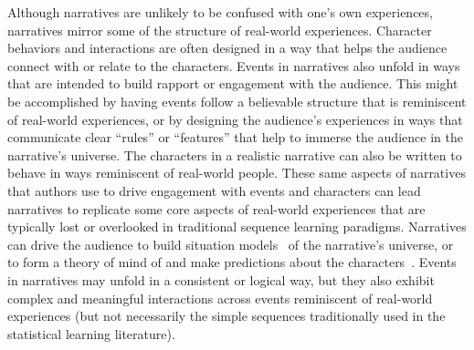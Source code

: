 \documentclass[10pt]{article}
\begin{document}
Although narratives are unlikely to be confused with one's own experiences,
narratives mirror some of the structure of real-world experiences. Character
behaviors and interactions are often designed in a way that helps the audience
connect with or relate to the characters. Events in narratives also unfold in
ways that are intended to build rapport or engagement with the audience. This
might be accomplished by having events follow a believable structure that is
reminiscent of real-world experiences, or by designing the audience's
experiences in ways that communicate clear ``rules'' or ``features'' that help
to immerse the audience in the narrative's universe. The characters in a
realistic narrative can also be written to behave in ways reminiscent of
real-world people. These same aspects of narratives that authors use to drive
engagement with events and characters can lead narratives to replicate some
core aspects of real-world experiences that are typically lost or overlooked in
traditional sequence learning paradigms. Narratives can drive the audience to
build situation models~\citep{RadvCope06, ZwaaRadv98} of the narrative's
universe, or to form a theory of mind of and make predictions about the
characters~\citep{TamiThor18, KostSaxe13}. Events in narratives may unfold in a
consistent or logical way, but they also exhibit complex and meaningful
interactions across events reminiscent of real-world experiences (but not
necessarily the simple sequences traditionally used in the statistical learning
literature).
\end{document}
